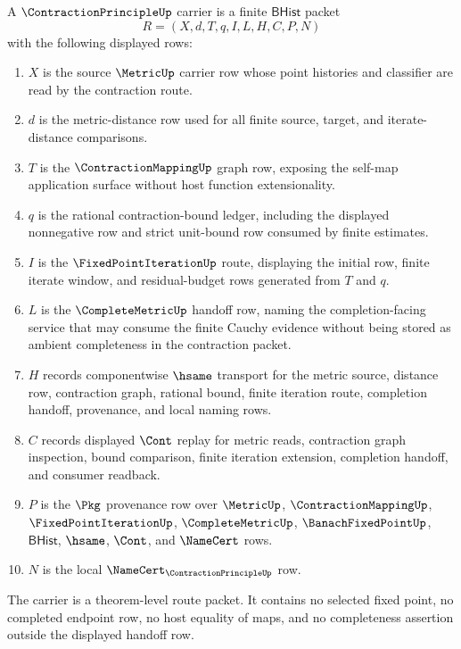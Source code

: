 \begin{definition}
\label{def:contraction-principle-carrier}
A $\ContractionPrincipleUp$ carrier is a finite $\mathsf{BHist}$ packet
$$
R=(X,d,T,q,I,L,H,C,P,N)
$$
with the following displayed rows:
\begin{enumerate}
\item $X$ is the source $\MetricUp$ carrier row whose point histories and classifier are read by the contraction route.
\item $d$ is the metric-distance row used for all finite source, target, and iterate-distance comparisons.
\item $T$ is the $\ContractionMappingUp$ graph row, exposing the self-map application surface without host function extensionality.
\item $q$ is the rational contraction-bound ledger, including the displayed nonnegative row and strict unit-bound row consumed by finite estimates.
\item $I$ is the $\FixedPointIterationUp$ route, displaying the initial row, finite iterate window, and residual-budget rows generated from $T$ and $q$.
\item $L$ is the $\CompleteMetricUp$ handoff row, naming the completion-facing service that may consume the finite Cauchy evidence without being stored as ambient completeness in the contraction packet.
\item $H$ records componentwise $\hsame$ transport for the metric source, distance row, contraction graph, rational bound, finite iteration route, completion handoff, provenance, and local naming rows.
\item $C$ records displayed $\Cont$ replay for metric reads, contraction graph inspection, bound comparison, finite iteration extension, completion handoff, and consumer readback.
\item $P$ is the $\Pkg$ provenance row over $\MetricUp$, $\ContractionMappingUp$, $\FixedPointIterationUp$, $\CompleteMetricUp$, $\BanachFixedPointUp$, $\mathsf{BHist}$, $\hsame$, $\Cont$, and $\NameCert$ rows.
\item $N$ is the local $\NameCert_{\ContractionPrincipleUp}$ row.
\end{enumerate}
The carrier is a theorem-level route packet. It contains no selected fixed point, no completed endpoint row, no host equality of maps, and no completeness assertion outside the displayed handoff row.
\end{definition}

